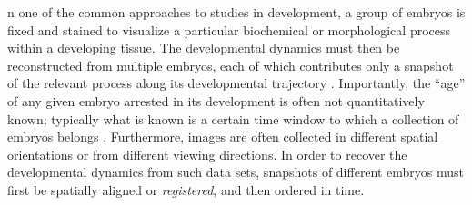 \documentclass{pnastwo}
\begin{document}
\begin{article}






n one of the common approaches to studies in development, a group of embryos is fixed and stained to visualize a particular biochemical or morphological process within a developing tissue. 
%
The developmental dynamics must then be reconstructed from multiple embryos, each of which contributes only a snapshot of the relevant process along its developmental trajectory \cite{jaeger2004dynamic, peter2011gene, fowlkes2008quantitative}.
%
Importantly, the ``age'' of any given embryo arrested in its development is often not quantitatively known; typically what is known is
a certain time window to which a collection of embryos belongs \cite{ng2012large, richardson2014emage, castro2009automatic}.
%
Furthermore, images are often collected in different spatial orientations or from different viewing directions.
%
In order to recover the developmental dynamics from such data sets, snapshots of different embryos must first be spatially aligned or {\em registered}, and then ordered in time.
%



\end{article}
\end{document}
